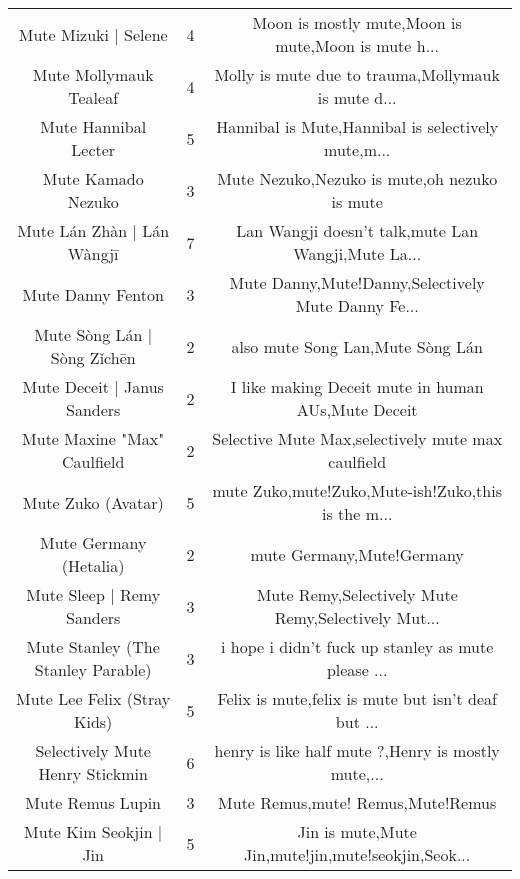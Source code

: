 \begin{table}[h!]
{\begin{tabular}{|c|c|c|}
                              Mute Mizuki | Selene &      4 & Moon is mostly mute,Moon is mute,Moon is mute h... \\
                            Mute Mollymauk Tealeaf &      4 & Molly is mute due to trauma,Mollymauk is mute d... \\
                              Mute Hannibal Lecter &      5 & Hannibal is Mute,Hannibal is selectively mute,m... \\
                                Mute Kamado Nezuko &      3 &       Mute Nezuko,Nezuko is mute,oh nezuko is mute \\
                        Mute Lán Zhàn | Lán Wàngjī &      7 & Lan Wangji doesn't talk,mute Lan Wangji,Mute La... \\
                                 Mute Danny Fenton &      3 & Mute Danny,Mute!Danny,Selectively Mute Danny Fe... \\
                       Mute Sòng Lán | Sòng Zǐchēn &      2 &                   also mute Song Lan,Mute Sòng Lán \\
                       Mute Deceit | Janus Sanders &      2 & I like making Deceit mute in human AUs,Mute Deceit \\
                       Mute Maxine "Max" Caulfield &      2 &  Selective Mute Max,selectively mute max caulfield \\
                                Mute Zuko (Avatar) &      5 & mute Zuko,mute!Zuko,Mute-ish!Zuko,this is the m... \\
                            Mute Germany (Hetalia) &      2 &                          mute Germany,Mute!Germany \\
                         Mute Sleep | Remy Sanders &      3 & Mute Remy,Selectively Mute Remy,Selectively Mut... \\
                Mute Stanley (The Stanley Parable) &      3 & i hope i didn't fuck up stanley as mute please ... \\
                       Mute Lee Felix (Stray Kids) &      5 & Felix is mute,felix is mute but isn’t deaf but ... \\
                   Selectively Mute Henry Stickmin &      6 & henry is like half mute ?,Henry is mostly mute,... \\
                                  Mute Remus Lupin &      3 &                  Mute Remus,mute! Remus,Mute!Remus \\
                            Mute Kim Seokjin | Jin &      5 & Jin is mute,Mute Jin,mute!jin,mute!seokjin,Seok... \\

\end{tabular}}
\end{table}
